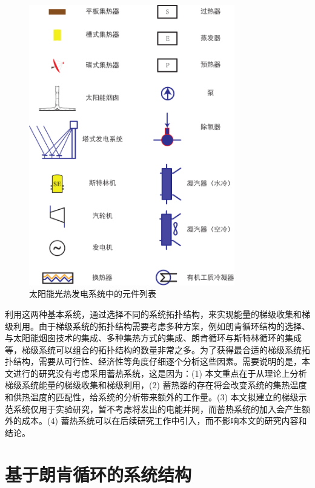 \begin{figure}[t!]
\centering
\includegraphics[width=0.8\textwidth]{fig/Legends.pdf}
\caption{太阳能光热发电系统中的元件列表}
\label{fig:Legends}
\end{figure}

利用这两种基本系统，通过选择不同的系统拓扑结构，来实现能量的梯级收集和梯级利用。由于梯级系统的拓扑结构需要考虑多种方案，例如朗肯循环结构的选择、与太阳能烟囱技术的集成、多种集热方式的集成、朗肯循环与斯特林循环的集成等，梯级系统可以组合的拓扑结构的数量非常之多。为了获得最合适的梯级系统拓扑结构，需要从可行性、经济性等角度仔细逐个分析这些因素。需要说明的是，本文进行的研究没有考虑采用蓄热系统，这是因为：(1) 本文重点在于从理论上分析梯级系统能量的梯级收集和梯级利用，{}(2) 蓄热器的存在将会改变系统的集热温度和供热温度的匹配性，给系统的分析带来额外的工作量。(3) 本文拟建立的梯级示范系统仅用于实验研究，暂不考虑将发出的电能并网，而蓄热系统的加入会产生额外的成本。(4) 蓄热系统可以在后续研究工作中引入，而不影响本文的研究内容和结论。

\section{基于朗肯循环的系统结构}
\label{sec:RankineCycleBased}

